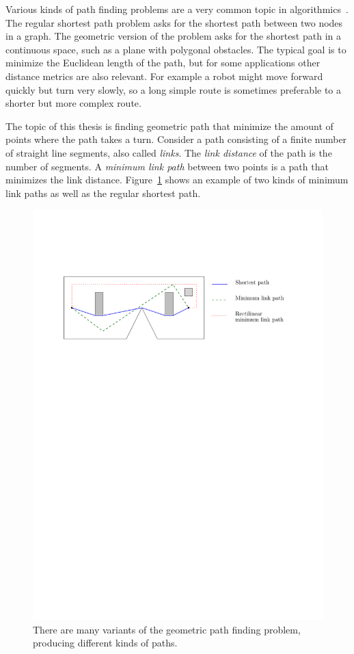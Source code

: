 \documentclass[english,gradu]{tktltiki2018}
\begin{document}
Various kinds of path finding problems are a very common topic in algorithmics~\cite{survey}.
The regular shortest path problem asks for the shortest path between two nodes in a graph.
The geometric version of the problem asks for the shortest path in a continuous space, such as a plane with polygonal obstacles.
The typical goal is to minimize the Euclidean length of the path, but for some applications other distance metrics are also relevant.
For example a robot might move forward quickly but turn very slowly, so a long simple route is sometimes preferable to a shorter but more complex route.

The topic of this thesis is finding geometric path that minimize the amount of points where the path takes a turn.
Consider a path consisting of a finite number of straight line segments, also called \emph{links}.
The \emph{link distance} of the path is the number of segments.
A \emph{minimum link path} between two points is a path that minimizes the link distance.
Figure~\ref{fig:paths} shows an example of two kinds of minimum link paths as well as the regular shortest path.

\begin{figure}\centering
	\includegraphics[width=\textwidth]{fig/paths}
	\caption{There are many variants of the geometric path finding problem, producing different kinds of paths.}\label{fig:paths}
\end{figure}
\end{document}
